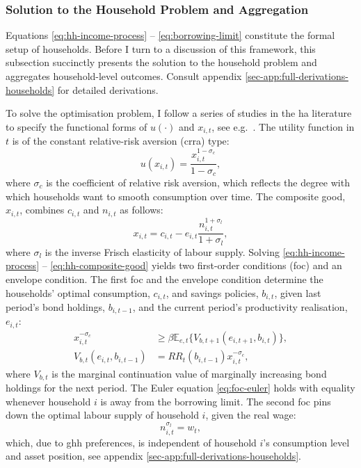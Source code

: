 \documentclass[a4paper,12pt]{article} %
\numberwithin{equation}{section} %
\numberwithin{figure}{section}
\numberwithin{table}{section}
\begin{document}
\subsubsection{Solution to the Household Problem and Aggregation}
\label{sec:model-hh-solution}

Equations \eqref{eq:hh-income-process} -- \eqref{eq:borrowing-limit} constitute the formal setup of households. Before I turn to a discussion of this framework, this subsection succinctly presents the solution to the household problem and aggregates household-level outcomes. Consult appendix \ref{sec-app:full-derivations-households} for detailed derivations.

To solve the optimisation problem, I follow a series of studies in the \Gls{ha} literature to specify the functional forms of $u( \cdot )$ and $x_{i,t}$, see e.g.~\textcite{bayer2023}. The utility function in $t$ is of the constant relative-risk aversion (\Gls{crra}) type:
\begin{equation}
    u(x_{i,t}) = \frac{x_{i,t}^{1-\sigma_c}}{1-\sigma_c}, \label{eq:hh-utility-fun}
\end{equation}
where $\sigma_c$ is the coefficient of relative risk aversion, which reflects the degree with which households want to smooth consumption over time. The composite good, $x_{i,t}$, combines $c_{i,t}$ and $n_{i,t}$ as follows:
\begin{equation}
    x_{i,t} = c_{i,t} - e_{i,t}\frac{n_{i,t}^{1+\sigma_l}}{1+\sigma_l},
    \label{eq:hh-composite-good}
\end{equation}
where $\sigma_l$ is the inverse Frisch elasticity of labour supply. Solving \eqref{eq:hh-income-process} -- \eqref{eq:hh-composite-good} yields two first-order conditions (\Gls{foc}) and an envelope condition. The first \Gls{foc} and the envelope condition determine the households' optimal consumption, $c_{i,t}$, and savings policies, $b_{i,t}$, given last period's bond holdings, $b_{i,t-1}$, and the current period's productivity realisation, $e_{i,t}$:
\begin{align}
    x_{i,t}^{-\sigma_c} &\ge \beta \mathbb{E}_{e,t} \{ V_{b,t+1} (e_{i,t+1}, b_{i,t}) \}, \label{eq:foc-euler} \\
    V_{b,t} (e_{i,t}, b_{i,t-1}) &= RR_t (b_{i,t-1}) x_{i,t}^{-\sigma_c}, \label{eq:foc-envelope} 
\end{align}
where $V_{b,t}$ is the marginal continuation value of marginally increasing bond holdings for the next period. The Euler equation \eqref{eq:foc-euler} holds with equality whenever household $i$ is away from the borrowing limit. The second \Gls{foc} pins down the optimal labour supply of household $i$, given the real wage:
\begin{equation}
n_{i,t}^{\sigma_l} = w_t, \label{eq:foc-labour-supply}
\end{equation}
which, due to \Gls{ghh} preferences, is independent of household $i$'s consumption level and asset position, see appendix \ref{sec-app:full-derivations-households}.
\end{document}
